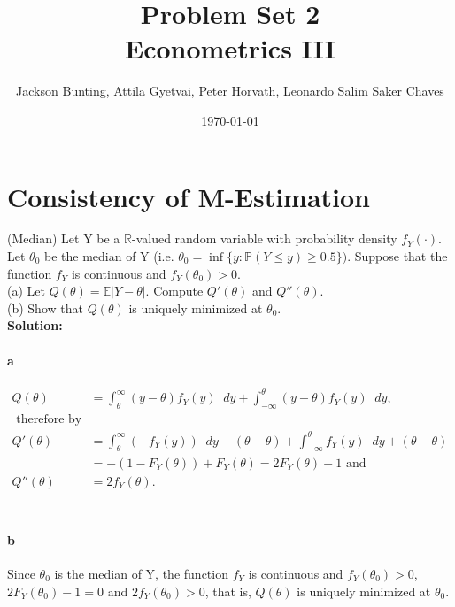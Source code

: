 \documentclass[11pt,letterpaper]{article}                  %
\title{Problem Set 2 \\ \medskip \Large{Econometrics III}}
\author{\Large Jackson Bunting, Attila Gyetvai, Peter Horvath, Leonardo Salim Saker Chaves}
\date{\today}
\newcommand*\diff{\mathop{}\!d} %
\begin{document}
\maketitle
\section{Consistency of M-Estimation} 


\begin{problem}(Median) Let Y be a $\mathbb{R}$-valued random variable with probability density $f_Y(\cdot)$. Let $\theta_0$ be the median of Y (i.e. $\theta_0 = \inf \{y: \mathbb{P}(Y \leq y) \geq 0.5 \}).$ Suppose that the function $f_Y$ is continuous and $f_Y(\theta_0) > 0$. \\
	(a) Let $Q(\theta) = \mathbb{E}|Y - \theta|.$ Compute $Q'(\theta)$ and $Q''(\theta)$.
	\\
	(b) Show that $Q(\theta)$ is uniquely minimized at $\theta_0$. \\
	
	\textbf{Solution:}  \\
	
	\paragraph*{a} 
	\begin{align*}
		Q(\theta) &= \int_{\theta}^{\infty} (y - \theta) f_Y(y) \diff y + \int_{-\infty}^{ \theta} (y - \theta) f_Y(y) \diff y, \\
		\text{ therefore by Leibniz rule we can get}\\
		Q'(\theta) &= \int_{\theta}^{\infty} (-f_Y(y)) \diff y - (\theta - \theta) + \int_{-\infty}^{ \theta} f_Y(y) \diff y +  (\theta - \theta) \\ 
		&= - (1 - F_Y(\theta)) + F_Y(\theta) = 2 F_Y(\theta) - 1 \text{ and }\\
      	Q''(\theta) &= 2 f_Y(\theta). \\
		\end{align*} \\
		\paragraph*{b} Since $\theta_0$ is the median of Y, the function $f_Y$ is continuous and $f_Y(\theta_0) > 0$, $2 F_Y(\theta_0) - 1 = 0$ and $2 f_Y(\theta_0) > 0$, that is, $Q(\theta)$ is uniquely minimized at $\theta_0$. 

\end{problem}
\end{document}
